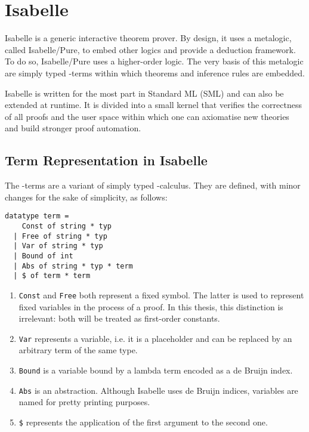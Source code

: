 \section{Isabelle}
Isabelle is a generic interactive theorem prover. By design, it uses a metalogic, called Isabelle/Pure, to embed other logics and provide a deduction framework. To do so, Isabelle/Pure uses a higher-order logic. The very basis of this metalogic are simply typed \lam -terms within which theorems and inference rules are embedded. \cite{wenzel_isabelleisar_2021}

Isabelle is written for the most part in Standard ML (SML) and can also be extended at runtime. It is divided into a small kernel that verifies the correctness of all proofs and the user space within which one can axiomatise new theories and build stronger proof automation.

\subsection{Term Representation in Isabelle}
The \lam -terms are a variant of simply typed \lam -calculus. They are defined, with minor changes for the sake of simplicity, as follows:
\begin{lstlisting}
datatype term =
    Const of string * typ
  | Free of string * typ
  | Var of string * typ
  | Bound of int
  | Abs of string * typ * term
  | $ of term * term
\end{lstlisting} %
\begin{enumerate}
  \item \lstinline{Const} and \lstinline{Free} both represent a fixed symbol. The latter is used to represent fixed variables in the process of a proof. In this thesis, this distinction is irrelevant: both will be treated as first-order constants.
  \item \lstinline{Var} represents a variable, i.e. it is a placeholder and can be replaced by an arbitrary term of the same type.
  \item \lstinline{Bound} is a variable bound by a lambda term encoded as a de Bruijn index. \cite{bruijn_lambda_nodate}
  \item \lstinline{Abs} is an abstraction. Although Isabelle uses de Bruijn indices, variables are named for pretty printing purposes.
  \item \lstinline{$} represents the application of the first argument to the second one.
\end{enumerate} %

